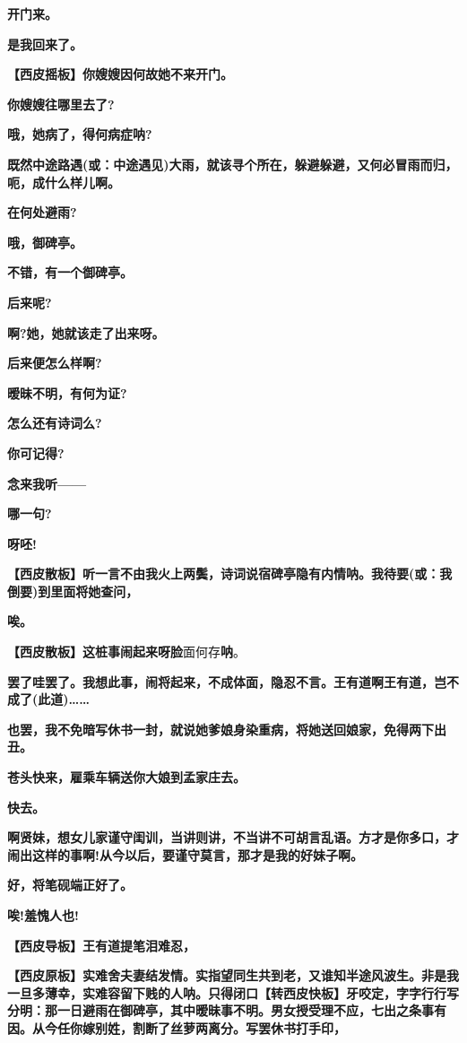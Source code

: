 \textbf{开门来。}

\textbf{是我回来了。}

\textbf{【西皮摇板】你嫂嫂因何故她不来开门。}

\textbf{你嫂嫂往哪里去了?}

\textbf{哦，她病了，得何病症呐?}

\textbf{既然中途路遇(或：中途遇见)大雨，就该寻个所在，躲避躲避，又何必冒雨而归，呃，成什么样儿啊。}

\textbf{在何处避雨?}

\textbf{哦，御碑亭。}

\textbf{不错，有一个御碑亭。}

\textbf{后来呢?}

\textbf{啊?她，她就该走了出来呀。}

\textbf{后来便怎么样啊?}

\textbf{暧昧不明，有何为证?}

\textbf{怎么还有诗词么?}

\textbf{你可记得?}

\textbf{念来我听------}

\textbf{哪一句?}

\textbf{呀呸!}

\textbf{【西皮散板】听一言不由我火上两鬓，诗词说宿碑亭隐有内情呐。我待要(或：我倒要)到里面将她查问，}

\textbf{唉。}

\textbf{【西皮散板】这桩事闹起来呀脸}面何存\textbf{呐}。

\textbf{罢了哇罢了。我想此事，闹将起来，不成体面，隐忍不言。王有道啊王有道，岂不成了(此道)\ldots{}\ldots{}}

\textbf{也罢，我不免暗写休书一封，就说她爹娘身染重病，将她送回娘家，免得两下出丑。}

\textbf{苍头快来，雇乘车辆送你大娘到孟家庄去。}

\textbf{快去。}

\textbf{啊贤妹，想女儿家谨守闺训，当讲则讲，不当讲不可胡言乱语。方才是你多口，才闹出这样的事啊!从今以后，要谨守莫言，那才是我的好妹子啊。}

\textbf{好，将笔砚端正好了。}

\textbf{唉!羞愧人也!}

\textbf{【西皮导板】王有道提笔泪难忍，}

\textbf{【西皮原板】实难舍夫妻结发情。实指望同生共到老，又谁知半途风波生。非是我一旦多薄幸，实难容留下贱的人呐。只得闭口【转西皮快板】牙咬定，字字行行写分明：那一日避雨在御碑亭，其中暧昧事不明。男女授受理不应，七出之条事有因。从今任你嫁别姓，割断了丝萝两离分。写罢休书打手印，}

